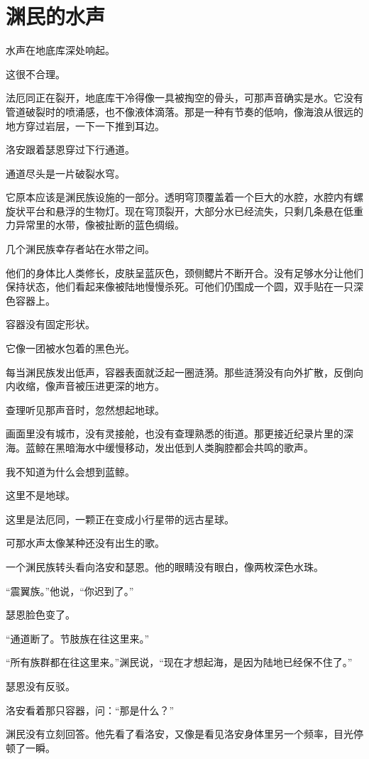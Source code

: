 \chapter{渊民的水声}

水声在地底库深处响起。

这很不合理。

法厄同正在裂开，地底库干冷得像一具被掏空的骨头，可那声音确实是水。它没有管道破裂时的喷涌感，也不像液体滴落。那是一种有节奏的低响，像海浪从很远的地方穿过岩层，一下一下推到耳边。

洛安跟着瑟恩穿过下行通道。

通道尽头是一片破裂水穹。

它原本应该是渊民族设施的一部分。透明穹顶覆盖着一个巨大的水腔，水腔内有螺旋状平台和悬浮的生物灯。现在穹顶裂开，大部分水已经流失，只剩几条悬在低重力异常里的水带，像被扯断的蓝色绸缎。

几个渊民族幸存者站在水带之间。

他们的身体比人类修长，皮肤呈蓝灰色，颈侧鳃片不断开合。没有足够水分让他们保持状态，他们看起来像被陆地慢慢杀死。可他们仍围成一个圆，双手贴在一只深色容器上。

容器没有固定形状。

它像一团被水包着的黑色光。

每当渊民族发出低声，容器表面就泛起一圈涟漪。那些涟漪没有向外扩散，反倒向内收缩，像声音被压进更深的地方。

查理听见那声音时，忽然想起地球。

画面里没有城市，没有灵接舱，也没有查理熟悉的街道。那更接近纪录片里的深海。蓝鲸在黑暗海水中缓慢移动，发出低到人类胸腔都会共鸣的歌声。

我不知道为什么会想到蓝鲸。

这里不是地球。

这里是法厄同，一颗正在变成小行星带的远古星球。

可那水声太像某种还没有出生的歌。

一个渊民族转头看向洛安和瑟恩。他的眼睛没有眼白，像两枚深色水珠。

“震翼族。”他说，“你迟到了。”

瑟恩脸色变了。

“通道断了。节肢族在往这里来。”

“所有族群都在往这里来。”渊民说，“现在才想起海，是因为陆地已经保不住了。”

瑟恩没有反驳。

洛安看着那只容器，问：“那是什么？”

渊民没有立刻回答。他先看了看洛安，又像是看见洛安身体里另一个频率，目光停顿了一瞬。

